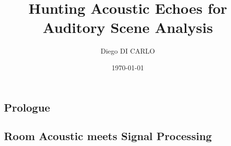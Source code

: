 \documentclass[pdftex,dvipsnames]{dissertation}
\title{Hunting Acoustic Echoes for Auditory Scene Analysis}
\author{Diego DI CARLO}
\date{\today}
\begin{document}
\frontmatter{}

% 



\blankpage{}

\blankpage{}


\cleardoublepage{}

\doparttoc[n]
\tableofcontents*{}
\clearpage{}


\cleardoublepage{}
\clearpage{}






\cleardoublepage{}

\setcounter{mtc}{9}

\mainmatter{}

\begin{fullwidth}
    \part{Prologue}
\end{fullwidth}
\parttoc[n]
\cleardoublepage{}

% 

\begin{fullwidth}
    \part{Room Acoustic meets Signal Processing}\label{pt:background}
\end{fullwidth}
\parttoc[n]
% 
% 
\end{document}
